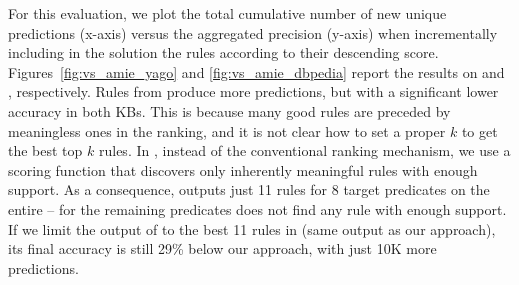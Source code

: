 For this evaluation, we plot the total cumulative number of new unique predictions (x-axis) versus the aggregated precision (y-axis) when incrementally including in the solution the rules according to their descending score. Figures~\ref{fig:vs_amie_yago} and \ref{fig:vs_amie_dbpedia} report the results
on \yago and \dbpedia, respectively. 
Rules from \amie produce more predictions, but with a significant lower accuracy in both KBs. This is because many good rules are preceded by meaningless ones in the ranking, and it is not clear how to set a proper $k$ to get the best top $k$ rules. 
In \krd, instead of the conventional ranking mechanism, we use a scoring function that discovers only inherently meaningful rules with enough support. 
%
As a consequence, \krd outputs just 11 rules for 8 target predicates on the entire \yago\@-- for the remaining predicates \krd does not find any rule with enough support. If we limit the output of \amie to the best 11 rules in \yago (same output as our approach), its final accuracy is still 29\% below our approach, with just 10K more predictions.





